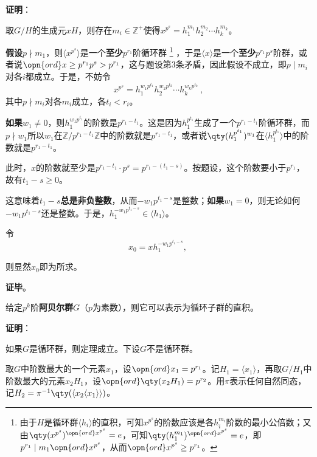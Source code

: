 \textbf{证明}：

取$G/H$的生成元$xH$，则存在$m_i\in \mathbb{Z}^+$使得$x^{p^s}=h_1^{m_1}h_2^{m_2}\cdots h_k^{m_k}$。

\textbf{假设}$p\nmid m_1$，则$\langle x^{p^s} \rangle$是一个\textbf{至少}$p^{r_1}$阶循环群
\footnote{由于$H$是循环群$\langle h_i \rangle$的直积，可知$x^{p^s}$的阶数应该是各$h_i^{m_i}$阶数的最小公倍数；又由$\qty(x^{p^s})^{\opn{ord}x^{p^s}}=e$，可知$\qty(h_1^{m_1})^{\opn{ord}x^{p^s}}=e$，即$p^{r_1}\mid m_1\opn{ord}x^{p^s}$，从而$\opn{ord}x^{p^s}\geq p^{r_1}$。}
，于是$\langle x \rangle$是一个\textbf{至少}$p^{r_1}p^s$阶群，或者说$\opn{ord}x\geq p^{r_1}p^s>p^{r_1}$，这与题设第$3$条矛盾，因此假设不成立，即$p\mid m_i$对各$i$都成立。于是，不妨令
\begin{equation}
    x^{p^s}=h_1^{w_1p^{t_1}}h_2^{w_2p^{t_2}}\cdots h_k^{w_kp^{t_k}}~, 
\end{equation}
其中$p\nmid m_i$对各$m_i$成立，各$t_i<r_i$。

\textbf{如果}$w_1\not=0$，则$h_1^{w_1p^{t_1}}$的阶数是$p^{r_1-t_1}$。这是因为$h_1^{p^{t_1}}$生成了一个$p^{r_1-t_1}$阶循环群，而$p\nmid w_1$所以$w_1$在$\mathbb{Z}/p^{r_1-t_1}\mathbb{Z}$中的阶数就是$p^{r_1-t_1}$，或者说$\qty(h_1^{p^{t_1}})^{w_1}$在$\langle h_1^{p^{t_1}} \rangle$中的阶数就是$p^{r_1-t_1}$。

此时，$x$的阶数就至少是$p^{r_1-t_1}\cdot p^{s}=p^{r_1-(t_1-s)}$。按题设，这个阶数要小于$p^{r_1}$，故有$t_1-s\geq 0$。

这意味着$t_1-s$\textbf{总是非负整数}，从而$-w_1p^{t_1-s}$是整数；\textbf{如果}$w_1=0$，则无论如何$-w_1p^{t_1-s}$还是整数。于是，$h_1^{-w_1p^{t_1-s}}\in \langle h_1 \rangle$。



令
\begin{equation}
    x_0 = x h_1^{-w_1p^{t_1-s}}, ~
\end{equation}

则显然$x_0$即为所求。



\textbf{证毕}。



\begin{theorem}{}
给定$p^k$阶\textbf{阿贝尔群}$G$（$p$为素数），则它可以表示为循环子群的直积。
\end{theorem}


\textbf{证明}：

如果$G$是循环群，则定理成立。下设$G$不是循环群。

取$G$中阶数最大的一个元素$x_1$，设$\opn{ord}x_1=p^{r_1}$。记$H_1=\langle x_1 \rangle$，再取$G/H_1$中阶数最大的元素$x_2H_1$，设$\opn{ord}\qty(x_2H_1) = p^{r_2}$。用$\pi$表示任何自然同态，记$H_2=\pi^{-1}\qty(\langle x_2\langle x_1 \rangle \rangle)$。


